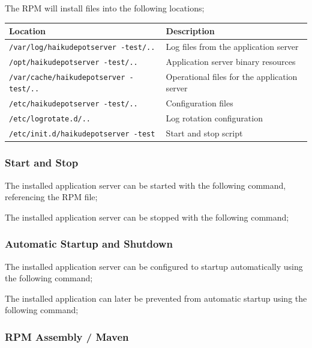 The RPM will install files into the following locations;

\begin{tabular}{|l|l|}
\hline
Location & Description \\
\hline
{\tt /var/log/haikudepotserver{\color{magenta} -test}/..} & Log files from the application server \\
{\tt /opt/haikudepotserver{\color{magenta} -test}/..} & Application server binary resources \\
{\tt /var/cache/haikudepotserver{\color{magenta} -test}/..} & Operational files for the application server \\
{\tt /etc/haikudepotserver{\color{magenta} -test}/..} & Configuration files \\
{\tt /etc/logrotate.d/..} & Log rotation configuration \\
{\tt /etc/init.d/haikudepotserver{\color{magenta} -test}} & Start and stop script \\
\hline
\end{tabular}

\subsubsection{Start and Stop}

The installed application server can be started with the following command, referencing the RPM file;


The installed application server can be stopped with the following command;


\subsubsection{Automatic Startup and Shutdown}

The installed application server can be configured to startup automatically using the following command;


The installed application can later be prevented from automatic startup using the following command;


\subsubsection{RPM Assembly / Maven}

